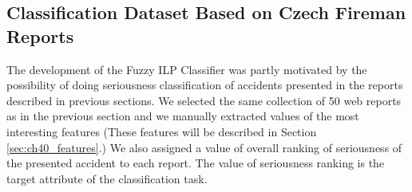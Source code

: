 \subsection{Classification Dataset Based on Czech Fireman Reports} \label{sec:ch40_classify_fireman}

The development of the Fuzzy ILP Classifier was partly motivated by the possibility of doing seriousness classification of accidents presented in the reports described in previous sections. We selected the same collection of 50 web reports as in the previous section and we manually extracted values of the most interesting features (These features will be described in Section \ref{sec:ch40_features}.) We also assigned a value of overall ranking of seriousness of the presented accident to each report.  The value of seriousness ranking is the target attribute of the classification task. 








